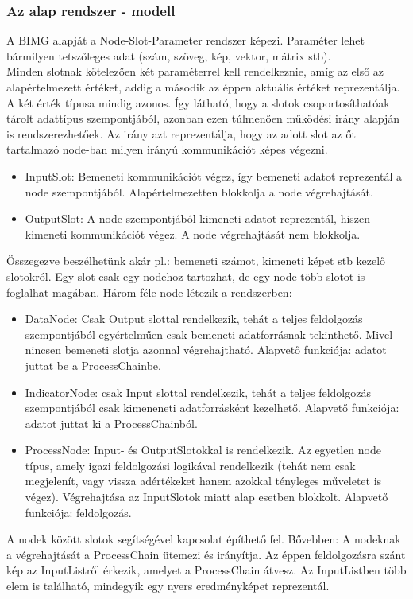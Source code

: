 \documentclass[a4paper,12pt,oneside]{report}
\begin{document}
\subsubsection{Az alap rendszer - modell}
A BIMG alapját a Node-Slot-Parameter rendszer képezi. Paraméter lehet bármilyen tetszőleges adat (szám, szöveg, kép, vektor, mátrix stb).\\ Minden slotnak kötelezően két paraméterrel kell rendelkeznie, amíg az első az alapértelmezett értéket, addig a második az éppen aktuális értéket reprezentálja. A két érték típusa mindig azonos. Így látható, hogy a slotok csoportosíthatóak  tárolt adattípus szempontjából, azonban ezen túlmenően működési irány alapján is rendszerezhetőek. Az irány azt reprezentálja, hogy az adott slot az őt tartalmazó node-ban milyen irányú kommunikációt képes végezni.
\begin{itemize}
	\itemsep0em
	\item InputSlot: Bemeneti kommunikációt végez, így bemeneti adatot reprezentál a node szempontjából. Alapértelmezetten blokkolja a node végrehajtását.
	\item OutputSlot: A node szempontjából kimeneti adatot reprezentál, hiszen kimeneti kommunikációt végez. A node végrehajtását nem blokkolja.
\end{itemize}
Összegezve beszélhetünk akár pl.: bemeneti számot, kimeneti képet stb kezelő slotokról. Egy slot csak egy nodehoz tartozhat, de egy node több slotot is foglalhat magában.
Három féle node létezik a rendszerben:
\begin{itemize}
	\itemsep0em
	\item DataNode: Csak Output slottal rendelkezik, tehát a teljes feldolgozás szempontjából egyértelműen csak bemeneti adatforrásnak tekinthető. Mivel nincsen bemeneti slotja azonnal végrehajtható. Alapvető funkciója: adatot juttat be a ProcessChainbe.
	\item IndicatorNode: csak Input slottal rendelkezik, tehát a teljes feldolgozás szempontjából csak kimeneneti adatforrásként kezelhető. Alapvető funkciója: adatot juttat ki a ProcessChainból.
	\item ProcessNode: Input- és OutputSlotokkal is rendelkezik. Az egyetlen node típus, amely igazi feldolgozási logikával rendelkezik (tehát nem csak megjelenít, vagy vissza adértékeket hanem azokkal tényleges műveletet is végez). Végrehajtása az InputSlotok miatt alap esetben blokkolt. Alapvető funkciója: feldolgozás.

\end{itemize}
A nodek között slotok segítségével kapcsolat építhető fel. Bővebben:  A nodeknak a végrehajtását a ProcessChain ütemezi és irányítja. Az éppen feldolgozásra szánt kép az InputListről érkezik, amelyet a ProcessChain átvesz. Az InputListben több elem is található, mindegyik egy nyers eredményképet reprezentál.\\
\end{document}
